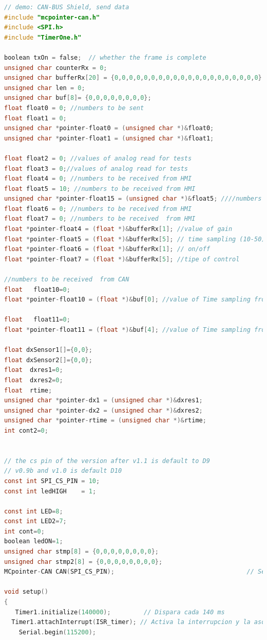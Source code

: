 {\tiny
\begin{lstlisting}[language=C]
// demo: CAN-BUS Shield, send data
#include "mcpointer-can.h"
#include <SPI.h>
#include "TimerOne.h"

boolean txOn = false;  // whether the frame is complete
unsigned char counterRx = 0;
unsigned char bufferRx[20] = {0,0,0,0,0,0,0,0,0,0,0,0,0,0,0,0,0,0,0,0};
unsigned char len = 0;
unsigned char buf[8]= {0,0,0,0,0,0,0,0};
float float0 = 0; //numbers to be sent
float float1 = 0;
unsigned char *pointer-float0 = (unsigned char *)&float0;
unsigned char *pointer-float1 = (unsigned char *)&float1;

float float2 = 0; //values of analog read for tests
float float3 = 0;//values of analog read for tests
float float4 = 0; //numbers to be received from HMI
float float5 = 10; //numbers to be received from HMI
unsigned char *pointer-float15 = (unsigned char *)&float5; ////numbers to be received time for sampling (ts)(float)
float float6 = 0; //numbers to be received from HMI
float float7 = 0; //numbers to be received  from HMI
float *pointer-float4 = (float *)&bufferRx[1]; //value of gain
float *pointer-float5 = (float *)&bufferRx[5]; // time sampling (10-50)
float *pointer-float6 = (float *)&bufferRx[1]; // on/off
float *pointer-float7 = (float *)&bufferRx[5]; //tipe of control

//numbers to be received  from CAN
float   float10=0;
float *pointer-float10 = (float *)&buf[0]; //value of Time sampling from CAN

float   float11=0; 
float *pointer-float11 = (float *)&buf[4]; //value of Time sampling from CAN

float dxSensor1[]={0,0};
float dxSensor2[]={0,0};
float  dxres1=0;
float  dxres2=0;
float  rtime;
unsigned char *pointer-dx1 = (unsigned char *)&dxres1;
unsigned char *pointer-dx2 = (unsigned char *)&dxres2;
unsigned char *pointer-rtime = (unsigned char *)&rtime;
int cont2=0;


// the cs pin of the version after v1.1 is default to D9
// v0.9b and v1.0 is default D10
const int SPI_CS_PIN = 10;
const int ledHIGH    = 1;

const int LED=8;
const int LED2=7;
int cont=0;
boolean ledON=1;
unsigned char stmp[8] = {0,0,0,0,0,0,0,0};
unsigned char stmp2[8] = {0,0,0,0,0,0,0,0};
MCpointer-CAN CAN(SPI_CS_PIN);                                    // Set CS pin

void setup()
{
   Timer1.initialize(140000);         // Dispara cada 140 ms
  Timer1.attachInterrupt(ISR_timer); // Activa la interrupcion y la asocia a ISR_Blin
    Serial.begin(115200);


\end{lstlisting}}
